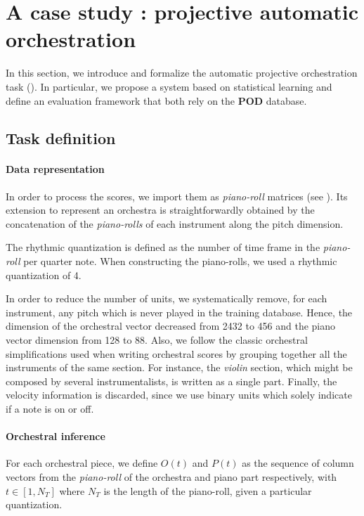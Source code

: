 \documentclass[twoside,twocolumn]{article}
\begin{document}
\section{A case study : projective automatic orchestration}

In this section, we introduce and formalize the automatic projective orchestration task (). In particular, we propose a system based on statistical learning and define an evaluation framework that both rely on the \textbf{POD} database.

\subsection{Task definition}
\paragraph{Data representation}
In order to process the scores, we import them as \textit{piano-roll} matrices (see ). 
Its extension to represent an orchestra is straightforwardly obtained by the concatenation of the \textit{piano-rolls} of each instrument along the pitch dimension.

The rhythmic quantization is defined as the number of time frame in the \textit{piano-roll} per quarter note. When constructing the piano-rolls, we used a rhythmic quantization of 4.

In order to reduce the number of units, we systematically remove, for each instrument, any pitch which is never played in the training database. Hence, the dimension of the orchestral vector decreased from 2432 to 456 and the piano vector dimension from 128 to 88.
Also, we follow the classic orchestral simplifications used when writing orchestral scores by grouping together all the instruments of the same section. For instance, the \textit{violin} section, which might be composed by several instrumentalists, is written as a single part.
Finally, the velocity information is discarded, since we use binary units which solely indicate if a note is on or off.

\paragraph{Orchestral inference}
For each orchestral piece, we define $O(t)$ and $P(t)$ as the sequence of column vectors from the \textit{piano-roll} of the orchestra and piano part respectively, with $t \in \left[ 1,N_{T} \right]$ where $N_{T}$ is the length of the piano-roll, given a particular quantization.
\end{document}
